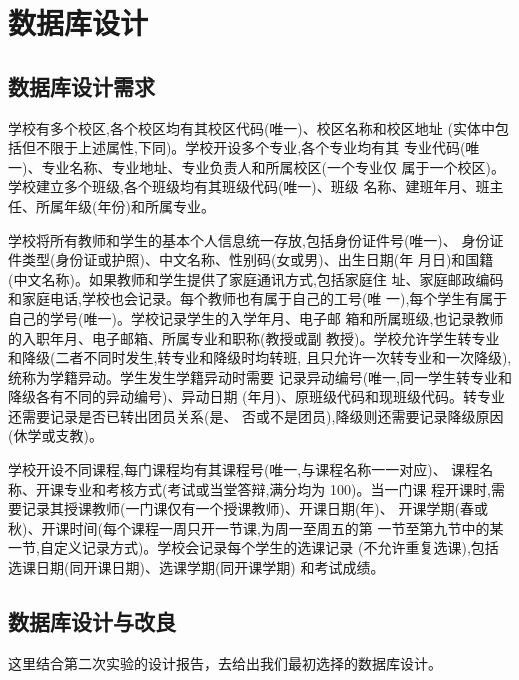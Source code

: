 \documentclass[../report.tex]{subfiles}
\begin{document}
\section {数据库设计}

\subsection {数据库设计需求}

学校有多个校区,各个校区均有其校区代码(唯一)、校区名称和校区地址
(实体中包括但不限于上述属性,下同)。学校开设多个专业,各个专业均有其
专业代码(唯一)、专业名称、专业地址、专业负责人和所属校区(一个专业仅
属于一个校区)。学校建立多个班级,各个班级均有其班级代码(唯一)、班级
名称、建班年月、班主任、所属年级(年份)和所属专业。

学校将所有教师和学生的基本个人信息统一存放,包括身份证件号(唯一)、
身份证件类型(身份证或护照)、中文名称、性别码(女或男)、出生日期(年
月日)和国籍(中文名称)。如果教师和学生提供了家庭通讯方式,包括家庭住
址、家庭邮政编码和家庭电话,学校也会记录。每个教师也有属于自己的工号(唯
一),每个学生有属于自己的学号(唯一)。学校记录学生的入学年月、电子邮
箱和所属班级,也记录教师的入职年月、电子邮箱、所属专业和职称(教授或副
教授)。学校允许学生转专业和降级(二者不同时发生,转专业和降级时均转班,
且只允许一次转专业和一次降级),统称为学籍异动。学生发生学籍异动时需要
记录异动编号(唯一,同一学生转专业和降级各有不同的异动编号)、异动日期
(年月)、原班级代码和现班级代码。转专业还需要记录是否已转出团员关系(是、
否或不是团员),降级则还需要记录降级原因(休学或支教)。

学校开设不同课程,每门课程均有其课程号(唯一,与课程名称一一对应)、
课程名称、开课专业和考核方式(考试或当堂答辩,满分均为 100)。当一门课
程开课时,需要记录其授课教师(一门课仅有一个授课教师)、开课日期(年)、
开课学期(春或秋)、开课时间(每个课程一周只开一节课,为周一至周五的第
一节至第九节中的某一节,自定义记录方式)。学校会记录每个学生的选课记录
(不允许重复选课),包括选课日期(同开课日期)、选课学期(同开课学期)
和考试成绩。

\subsection {数据库设计与改良}

这里结合第二次实验的设计报告，去给出我们最初选择的数据库设计。
\end{document}
